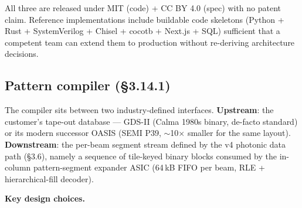 \documentclass[11pt,letterpaper]{article}
\begin{document}
All three are released under MIT (code) + CC BY 4.0 (spec) with no patent claim. Reference implementations include buildable code skeletons (Python + Rust + SystemVerilog + Chisel + cocotb + Next.js + SQL) sufficient that a competent team can extend them to production without re-deriving architecture decisions.

\subsection{Pattern compiler (\S 3.14.1)}

The compiler sits between two industry-defined interfaces. \textbf{Upstream}: the customer's tape-out database --- GDS-II (Calma 1980s binary, de-facto standard) or its modern successor OASIS (SEMI P39, $\sim$10$\times$ smaller for the same layout). \textbf{Downstream}: the per-beam segment stream defined by the v4 photonic data path (\S 3.6), namely a sequence of tile-keyed binary blocks consumed by the in-column pattern-segment expander ASIC (64\,kB FIFO per beam, RLE + hierarchical-fill decoder).

\textbf{Key design choices.}
\end{document}
